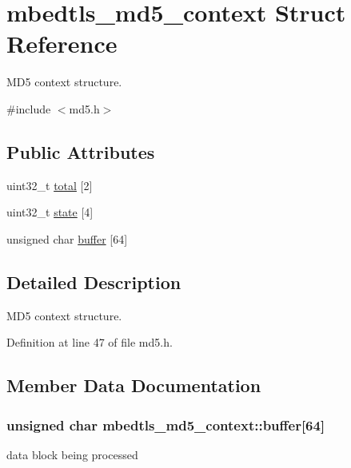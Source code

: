 \hypertarget{structmbedtls__md5__context}{\section{mbedtls\-\_\-md5\-\_\-context Struct Reference}
\label{structmbedtls__md5__context}
}


M\-D5 context structure.  




{\ttfamily \#include $<$md5.\-h$>$}

\subsection*{Public Attributes}
\begin{DoxyCompactItemize}
\item 
uint32\-\_\-t \hyperlink{structmbedtls__md5__context_a69e02fc353b932fe9f58fcae64506c6e}{total} \mbox{[}2\mbox{]}
\item 
uint32\-\_\-t \hyperlink{structmbedtls__md5__context_a17e9e7e1ab79b648e787969ee5b73929}{state} \mbox{[}4\mbox{]}
\item 
unsigned char \hyperlink{structmbedtls__md5__context_a456c4c1c0f77e12f5091e7fb7ecbb476}{buffer} \mbox{[}64\mbox{]}
\end{DoxyCompactItemize}


\subsection{Detailed Description}
M\-D5 context structure. 

Definition at line 47 of file md5.\-h.



\subsection{Member Data Documentation}
\hypertarget{structmbedtls__md5__context_a456c4c1c0f77e12f5091e7fb7ecbb476}{
\subsubsection[{buffer}]{\setlength{\rightskip}{0pt plus 5cm}unsigned char mbedtls\-\_\-md5\-\_\-context\-::buffer\mbox{[}64\mbox{]}}}\label{structmbedtls__md5__context_a456c4c1c0f77e12f5091e7fb7ecbb476}
data block being processed 

